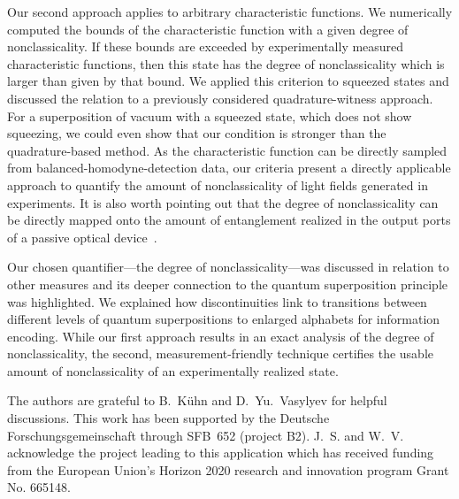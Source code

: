 \documentclass[aps,pra,twocolumn,showpacs,superscriptaddress,10pt]{revtex4-1}
\begin{document}
	Our second approach applies to arbitrary characteristic functions.
	We numerically computed the bounds of the characteristic function with a given degree of nonclassicality.
	If these bounds are exceeded by experimentally measured characteristic functions, then this state has the degree of nonclassicality which is larger than given by that bound.
	We applied this criterion to squeezed states and discussed the relation to a previously considered quadrature-witness approach.
	For a superposition of vacuum with a squeezed state, which does not show squeezing, we could even show that our condition is stronger than the quadrature-based method.
	As the characteristic function can be directly sampled from balanced-homodyne-detection data, our criteria present a directly applicable approach to quantify the amount of nonclassicality of light fields generated in experiments.
	It is also worth pointing out that the degree of nonclassicality can be directly mapped onto the amount of entanglement realized in the output ports of a passive optical device~\cite{Vogel2014}.

	Our chosen quantifier---the degree of nonclassicality---was discussed in relation to other measures and its deeper connection to the quantum superposition principle was highlighted.
	We explained how discontinuities link to transitions between different levels of quantum superpositions to enlarged alphabets for information encoding.
	While our first approach results in an exact analysis of the degree of nonclassicality, the second, measurement-friendly technique certifies the usable amount of nonclassicality of an experimentally realized state.
	
\begin{acknowledgments}
	The authors are grateful to B.~K\"uhn and D.~Yu.~Vasylyev for helpful discussions.
	This work has been supported by the Deutsche Forschungs\-gemeinschaft through SFB~652 (project B2).
	J.~S. and W.~V. acknowledge the project leading to this application which has received funding from the European Union's Horizon 2020 research and innovation program Grant No. 665148.
\end{acknowledgments}

\appendix*
\end{document}
